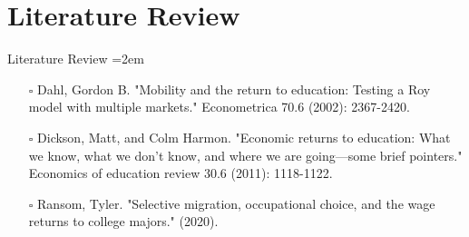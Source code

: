 \documentclass[9pt]{beamer}
\begin{document}
\section{Literature Review}
\begin{frame}{Literature Review}
\hangindent=2em
\begin{itemize}
\setlength\itemsep{1em}
    \item[$\square$] Dahl, Gordon B. "Mobility and the return to education: Testing a Roy model             with multiple markets." Econometrica 70.6 (2002): 2367-2420.
    \item[$\square$] Dickson, Matt, and Colm Harmon. "Economic returns to education: What we                know, what we don’t know, and where we are going—some brief                      pointers." Economics of education review 30.6 (2011): 1118-1122.
    \item[$\square$] Ransom, Tyler. "Selective migration, occupational choice, and the wage                 returns to college majors." (2020).
\end{itemize}

\end{frame}
\end{document}
